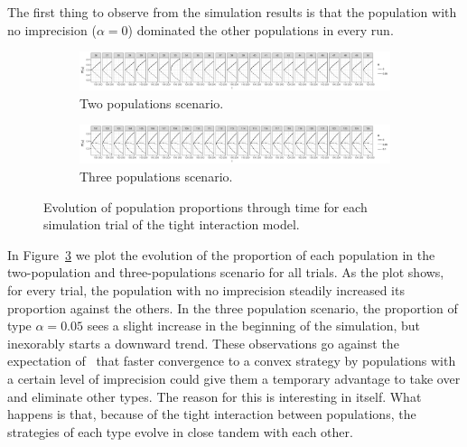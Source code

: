 \documentclass[a4paper]{article}
\begin{document}
The first thing to observe from the simulation results is that the population with no imprecision ($\alpha = 0$) dominated the other populations in every run.
\begin{figure}
  \centering
  \begin{subfigure}[]{\textwidth}
    \includegraphics[width=\textwidth]{simulation/results/round-3/plots/proportion-cases-0-005-strong.png}
    \caption{Two populations scenario.}
    \label{fig:proportion-cases-two-tight-interaction}
  \end{subfigure}
  \hfill
  \begin{subfigure}[]{\textwidth}
    \includegraphics[width=\textwidth]{simulation/results/round-3/plots/proportion-cases-0-005-01-strong.png}
    \caption{Three populations scenario.}
    \label{fig:proportion-cases-three-tight-interaction}
  \end{subfigure}
  \caption{Evolution of population proportions through time for each simulation trial of the tight interaction model.}
  \label{fig:proportion-cases-tight-interaction}
\end{figure}
In Figure~\ref{fig:proportion-cases-tight-interaction} we plot the evolution of the proportion of each population in the two-population and three-populations scenario for all trials.
As the plot shows, for every trial, the population with no imprecision steadily increased its proportion against the others.
In the three population scenario, the proportion of type $\alpha = 0.05$ sees a slight increase in the beginning of the simulation, but inexorably starts a downward trend.
These observations go against the expectation of~\textcite{franke_vagueness_2017} that faster convergence to a convex strategy by populations with a certain level of imprecision could give them a temporary advantage to take over and eliminate other types.
The reason for this is interesting in itself.
What happens is that, because of the tight interaction between populations, the strategies of each type evolve in close tandem with each other.
\end{document}
